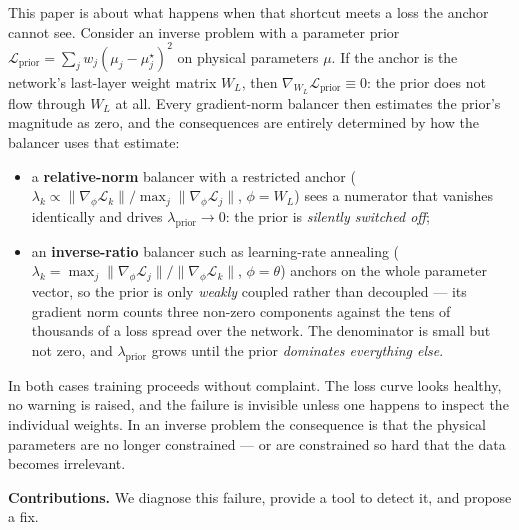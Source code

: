 \documentclass[a4paper,fleqn]{cas-sc}
\begin{document}
This paper is about what happens when that shortcut meets a loss the anchor
cannot see. Consider an inverse problem with a parameter prior
$\mathcal{L}_{\text{prior}} = \sum_j w_j(\mu_j - \mu_j^\star)^2$ on physical
parameters $\mu$. If the anchor is the network's last-layer weight matrix
$W_L$, then $\nabla_{W_L}\mathcal{L}_{\text{prior}} \equiv 0$: the prior does
not flow through $W_L$ at all. Every gradient-norm balancer then estimates the
prior's magnitude as zero, and the consequences are entirely determined by how
the balancer uses that estimate:

\begin{itemize}
\item a \textbf{relative-norm} balancer with a restricted anchor
($\lambda_k \propto \lVert\nabla_\phi \mathcal{L}_k\rVert /
\max_j \lVert\nabla_\phi \mathcal{L}_j\rVert$, $\phi = W_L$) sees a numerator
that vanishes identically and drives $\lambda_{\text{prior}} \to 0$: the prior
is \emph{silently switched off};
\item an \textbf{inverse-ratio} balancer such as learning-rate annealing
($\lambda_k = \max_j\lVert\nabla_\phi \mathcal{L}_j\rVert /
\lVert\nabla_\phi \mathcal{L}_k\rVert$, $\phi = \theta$) anchors on the whole
parameter vector, so the prior is only \emph{weakly} coupled rather than
decoupled --- its gradient norm counts three non-zero components against the
tens of thousands of a loss spread over the network. The denominator is small
but not zero, and $\lambda_{\text{prior}}$ grows until the prior
\emph{dominates everything else}.
\end{itemize}

In both cases training proceeds without complaint. The loss curve looks
healthy, no warning is raised, and the failure is invisible unless one happens
to inspect the individual weights. In an inverse problem the consequence is
that the physical parameters are no longer constrained --- or are constrained
so hard that the data becomes irrelevant.

\textbf{Contributions.} We diagnose this failure, provide a tool to detect it,
and propose a fix.
\end{document}
